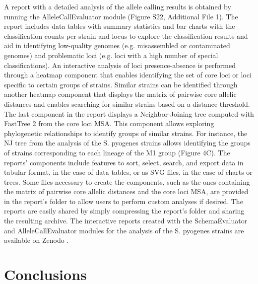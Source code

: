 A report with a detailed analysis of the allele calling results is obtained by running the AlleleCallEvaluator module (Figure S22, Additional File 1). The report includes data tables with summary statistics and bar charts with the classification counts per strain and locus to explore the classification results and aid in identifying low-quality genomes (e.g. misassembled or contaminated genomes) and problematic loci (e.g. loci with a high number of special classifications). An interactive analysis of loci presence-absence is performed through a heatmap component that enables identifying the set of core loci or loci specific to certain groups of strains. Similar strains can be identified through another heatmap component that displays the matrix of pairwise core allelic distances and enables searching for similar strains based on a distance threshold. The last component in the report displays a Neighbor-Joining tree computed with FastTree 2 \citep{price_fasttree_2010} from the core loci MSA. This component allows exploring phylogenetic relationships to identify groups of similar strains. For instance, the NJ tree from the analysis of the S. pyogenes strains allows identifying the groups of strains corresponding to each lineage of the M1 group (Figure 4C).
The reports' components include features to sort, select, search, and export data in tabular format, in the case of data tables, or as SVG files, in the case of charts or trees. Some files necessary to create the components, such as the ones containing the matrix of pairwise core allelic distances and the core loci MSA, are provided in the report's folder to allow users to perform custom analyses if desired. The reports are easily shared by simply compressing the report's folder and sharing the resulting archive. The interactive reports created with the SchemaEvaluator and AlleleCallEvaluator modules for the analysis of the S. pyogenes strains are available on Zenodo \citep{mamede_supplementary_2025}.

\section{Conclusions} \label{sec:conclusions}

